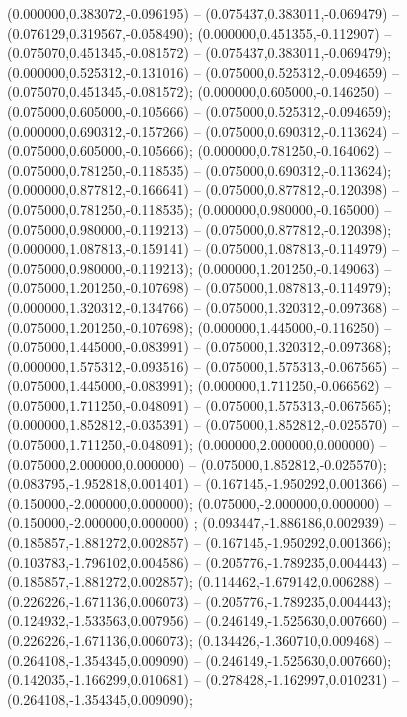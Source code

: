  (0.000000,0.383072,-0.096195) -- (0.075437,0.383011,-0.069479) -- (0.076129,0.319567,-0.058490);
 (0.000000,0.451355,-0.112907) -- (0.075070,0.451345,-0.081572) -- (0.075437,0.383011,-0.069479);
 (0.000000,0.525312,-0.131016) -- (0.075000,0.525312,-0.094659) -- (0.075070,0.451345,-0.081572);
 (0.000000,0.605000,-0.146250) -- (0.075000,0.605000,-0.105666) -- (0.075000,0.525312,-0.094659);
 (0.000000,0.690312,-0.157266) -- (0.075000,0.690312,-0.113624) -- (0.075000,0.605000,-0.105666);
 (0.000000,0.781250,-0.164062) -- (0.075000,0.781250,-0.118535) -- (0.075000,0.690312,-0.113624);
 (0.000000,0.877812,-0.166641) -- (0.075000,0.877812,-0.120398) -- (0.075000,0.781250,-0.118535);
 (0.000000,0.980000,-0.165000) -- (0.075000,0.980000,-0.119213) -- (0.075000,0.877812,-0.120398);
 (0.000000,1.087813,-0.159141) -- (0.075000,1.087813,-0.114979) -- (0.075000,0.980000,-0.119213);
 (0.000000,1.201250,-0.149063) -- (0.075000,1.201250,-0.107698) -- (0.075000,1.087813,-0.114979);
 (0.000000,1.320312,-0.134766) -- (0.075000,1.320312,-0.097368) -- (0.075000,1.201250,-0.107698);
 (0.000000,1.445000,-0.116250) -- (0.075000,1.445000,-0.083991) -- (0.075000,1.320312,-0.097368);
 (0.000000,1.575312,-0.093516) -- (0.075000,1.575313,-0.067565) -- (0.075000,1.445000,-0.083991);
 (0.000000,1.711250,-0.066562) -- (0.075000,1.711250,-0.048091) -- (0.075000,1.575313,-0.067565);
 (0.000000,1.852812,-0.035391) -- (0.075000,1.852812,-0.025570) -- (0.075000,1.711250,-0.048091);
 (0.000000,2.000000,0.000000) -- (0.075000,2.000000,0.000000) -- (0.075000,1.852812,-0.025570);
 (0.083795,-1.952818,0.001401) -- (0.167145,-1.950292,0.001366) -- (0.150000,-2.000000,0.000000);
 (0.075000,-2.000000,0.000000) -- (0.150000,-2.000000,0.000000) ;
 (0.093447,-1.886186,0.002939) -- (0.185857,-1.881272,0.002857) -- (0.167145,-1.950292,0.001366);
 (0.103783,-1.796102,0.004586) -- (0.205776,-1.789235,0.004443) -- (0.185857,-1.881272,0.002857);
 (0.114462,-1.679142,0.006288) -- (0.226226,-1.671136,0.006073) -- (0.205776,-1.789235,0.004443);
 (0.124932,-1.533563,0.007956) -- (0.246149,-1.525630,0.007660) -- (0.226226,-1.671136,0.006073);
 (0.134426,-1.360710,0.009468) -- (0.264108,-1.354345,0.009090) -- (0.246149,-1.525630,0.007660);
 (0.142035,-1.166299,0.010681) -- (0.278428,-1.162997,0.010231) -- (0.264108,-1.354345,0.009090);
